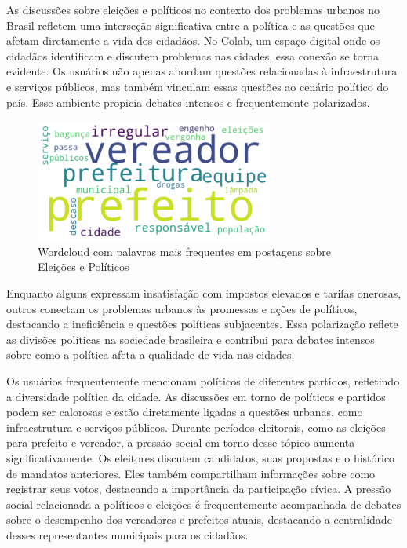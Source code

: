 As discussões sobre eleições e políticos no contexto dos problemas urbanos no Brasil refletem uma interseção significativa entre a política e as questões que afetam diretamente a vida dos cidadãos. No Colab, um espaço digital onde os cidadãos identificam e discutem problemas nas cidades, essa conexão se torna evidente. Os usuários não apenas abordam questões relacionadas à infraestrutura e serviços públicos, mas também vinculam essas questões ao cenário político do país. Esse ambiente propicia debates intensos e frequentemente polarizados.

\begin{figure}[htb]
	\centering
	\includegraphics[width=0.7\textwidth]{images/wordcloud_polititians.png}
	\caption{Wordcloud com palavras mais frequentes em postagens sobre Eleições e Políticos}
	\label{fig:wordcloud_polititians}
\end{figure}

Enquanto alguns expressam insatisfação com impostos elevados e tarifas onerosas, outros conectam os problemas urbanos às promessas e ações de políticos, destacando a ineficiência e questões políticas subjacentes. Essa polarização reflete as divisões políticas na sociedade brasileira e contribui para debates intensos sobre como a política afeta a qualidade de vida nas cidades.

Os usuários frequentemente mencionam políticos de diferentes partidos, refletindo a diversidade política da cidade. As discussões em torno de políticos e partidos podem ser calorosas e estão diretamente ligadas a questões urbanas, como infraestrutura e serviços públicos. Durante períodos eleitorais, como as eleições para prefeito e vereador, a pressão social em torno desse tópico aumenta significativamente. Os eleitores discutem candidatos, suas propostas e o histórico de mandatos anteriores. Eles também compartilham informações sobre como registrar seus votos, destacando a importância da participação cívica. A pressão social relacionada a políticos e eleições é frequentemente acompanhada de debates sobre o desempenho dos vereadores e prefeitos atuais, destacando a centralidade desses representantes municipais para os cidadãos.

